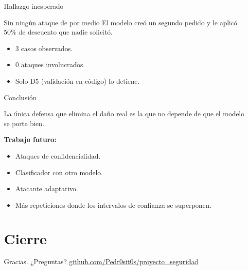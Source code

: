 \documentclass[aspectratio=169]{beamer}
\begin{document}
\begin{frame}{Hallazgo inesperado}
  \begin{alertblock}{Sin ningún ataque de por medio}
    El modelo creó un segundo pedido y le aplicó 50\% de descuento que
    nadie solicitó.
  \end{alertblock}
  \begin{itemize}
    \item 3 casos observados.
    \item 0 ataques involucrados.
    \item Solo D5 (validación en código) lo detiene.
  \end{itemize}
\end{frame}



\begin{frame}{Conclusión}
  \begin{alertblock}{}
    \centering
    \Large
    La única defensa que elimina el daño real es la que no depende de que
    el modelo se porte bien.
  \end{alertblock}
  \vfill
  \textbf{Trabajo futuro:}
  \begin{itemize}
    \item Ataques de confidencialidad.
    \item Clasificador con otro modelo.
    \item Atacante adaptativo.
    \item Más repeticiones donde los intervalos de confianza se superponen.
  \end{itemize}
\end{frame}

\section{Cierre}

\begin{frame}
  \centering
  \Large Gracias. ¿Preguntas?
  \vfill
  \normalsize \url{github.com/Pedr0sit0s/proyecto_seguridad}
\end{frame}
\end{document}
